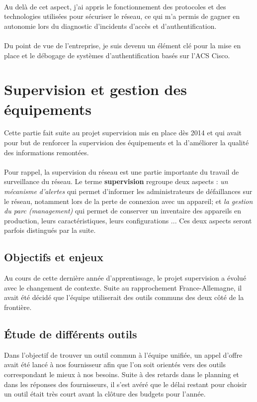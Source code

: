 \documentclass[a4paper,12pt]{report}
\begin{document}
\paragraph{}
Au delà de cet aspect, j'ai appris le fonctionnement des protocoles et des technologies utilisées pour sécuriser le réseau, ce qui m'a permis de gagner en autonomie lors du diagnostic d'incidents d'accès et d'authentification.
\paragraph{}
Du point de vue de l'entreprise, je suis devenu un élément clé pour la mise en place et le débogage de systèmes d'authentification basés sur l'ACS Cisco.

\section{Supervision et gestion des équipements}
Cette partie fait suite au projet supervision mis en place dès 2014 et qui avait pour but de renforcer la supervision des équipements et la d'améliorer la qualité des informations remontées.
\paragraph{}
Pour rappel, la supervision du réseau est une partie importante du travail de surveillance du réseau. Le terme \textbf{supervision} regroupe deux aspects : \textit{un mécanisme d'alertes} qui permet d'informer les administrateurs de défaillances sur le réseau, notamment lors de la perte de connexion avec un appareil; et \textit{la gestion du parc (management)} qui permet de conserver un inventaire des appareils en production, leurs caractéristiques, leurs configurations ... Ces deux aspects seront parfois distingués par la suite.

\subsection{Objectifs et enjeux}
Au cours de cette dernière année d'apprentissage, le projet supervision a évolué avec le changement de contexte. Suite au rapprochement France-Allemagne, il avait été décidé que l'équipe utiliserait des outils communs des deux côté de la frontière.

\subsection{Étude de différents outils}
Dans l'objectif de trouver un outil commun à l'équipe unifiée, un appel d'offre avait été lancé à nos fournisseur afin que l'on soit orientés vers des outils correspondant le mieux à nos besoins. Suite à des retards dans le planning et dans les réponses des fournisseurs, il s'est avéré que le délai restant pour choisir un outil était très court avant la clôture des budgets pour l'année.
\end{document}
